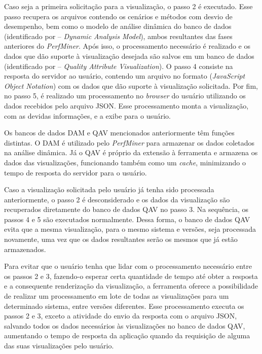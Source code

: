 Caso seja a primeira solicitação para a visualização, o passo 2 é executado. Esse passo recupera os arquivos contendo os cenários e métodos com desvio de desempenho, bem como o modelo de análise dinâmica do banco de dados (identificado por – \textit{Dynamic Analysis Model}), ambos resultantes das fases anteriores do \textit{PerfMiner}. Após isso, o processamento necessário é realizado e os dados que dão suporte à visualização desejada são salvos em um banco de dados (identificado por – \textit{Quality Attribute Visualization}). O passo 4 consiste na resposta do servidor ao usuário, contendo um arquivo no formato (\textit{JavaScript Object Notation}) com os dados que dão suporte à visualização solicitada. Por fim, no passo 5, é realizado um processamento no \textit{browser} do usuário utilizando os dados recebidos pelo arquivo JSON. Esse processamento monta a visualização, com as devidas informações, e a exibe para o usuário.

Os bancos de dados DAM e QAV mencionados anteriormente têm funções distintas. O DAM é utilizado pelo \textit{PerfMiner} para armazenar os dados coletados na análise dinâmica. Já o QAV é próprio da extensão à ferramenta e armazena os dados das visualizações, funcionando também como um \textit{cache}, minimizando o tempo de resposta do servidor para o usuário.

Caso a visualização solicitada pelo usuário já tenha sido processada anteriormente, o passo 2 é desconsiderado e os dados da visualização são recuperados diretamente do banco de dados QAV no passo 3. Na sequência, os passos 4 e 5 são executados normalmente. Dessa forma, o banco de dados QAV evita que a mesma visualização, para o mesmo sistema e versões, seja processada novamente, uma vez que os dados resultantes serão os mesmos que já estão armazenados.

Para evitar que o usuário tenha que lidar com o processamento necessário entre os passos 2 e 3, fazendo-o esperar certa quantidade de tempo até obter a resposta e a consequente renderização da visualização, a ferramenta oferece a possibilidade de realizar um processamento em lote de todas as visualizações para um determinado sistema, entre versões diferentes. Esse processamento executa os passos 2 e 3, exceto a atividade do envio da resposta com o arquivo JSON, salvando todos os dados necessários às visualizações no banco de dados QAV, aumentando o tempo de resposta da aplicação quando da requisição de alguma das suas visualizações pelo usuário.

